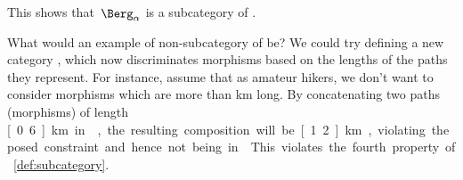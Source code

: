 This shows that~$\Berg_\alpha$ is a subcategory of \Berg.

What would an example of non-subcategory of \Berg be?
We could try defining a new category \Berglazy, which now discriminates morphisms based on the lengths of the paths they represent.
For instance, assume that as amateur hikers, we don't want to consider morphisms which are more than \unit[1]{km} long.
By concatenating two paths (morphisms) of length \unit[0.6]{km} in \Berglazy, the resulting composition will be \unit[1.2]{km}, violating the posed constraint and hence not being in \Berglazy.
This violates the fourth property of \cref{def:subcategory}.









